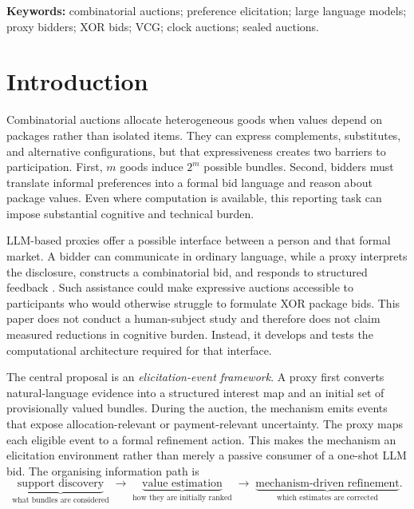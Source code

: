 \noindent\textbf{Keywords:} combinatorial auctions; preference elicitation; large language models; proxy bidders; XOR bids; VCG; clock auctions; sealed auctions.

\clearpage
\tableofcontents
\clearpage
\listoffigures
\clearpage
\listoftables
\clearpage
{}

\section{Introduction}

Combinatorial auctions allocate heterogeneous goods when values depend on
packages rather than isolated items. They can express complements,
substitutes, and alternative configurations, but that expressiveness creates
two barriers to participation. First, \(m\) goods induce \(2^m\) possible
bundles. Second, bidders must translate informal preferences into a formal bid
language and reason about package values. Even where computation is available,
this reporting task can impose substantial cognitive and technical burden.

LLM-based proxies offer a possible interface between a person and that formal
market. A bidder can communicate in ordinary language, while a proxy interprets
the disclosure, constructs a combinatorial bid, and responds to structured
feedback \citep{huang2025llmproxies}. Such assistance could make expressive
auctions accessible to participants who would otherwise struggle to formulate
XOR package bids. This paper does not conduct a human-subject study and
therefore does not claim measured reductions in cognitive burden. Instead, it
develops and tests the computational architecture required for that interface.

The central proposal is an \emph{elicitation-event framework}. A proxy first
converts natural-language evidence into a structured interest map and an
initial set of provisionally valued bundles. During the auction, the mechanism
emits events that expose allocation-relevant or payment-relevant uncertainty.
The proxy maps each eligible event to a formal refinement action. This makes
the mechanism an elicitation environment rather than merely a passive consumer
of a one-shot LLM bid. The organising information path is
\[
\underbrace{\text{support discovery}}_{\text{what bundles are considered}}
\;\longrightarrow\;
\underbrace{\text{value estimation}}_{\text{how they are initially ranked}}
\;\longrightarrow\;
\underbrace{\text{mechanism-driven refinement}}_{\text{which estimates are corrected}}.
\]

